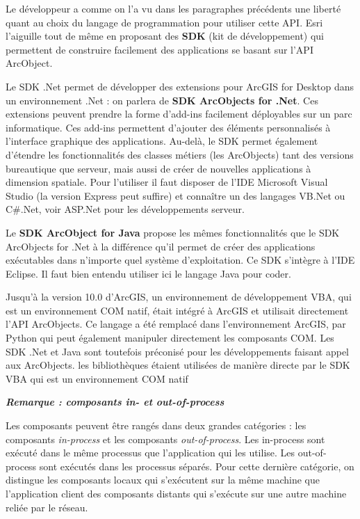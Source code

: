 \documentclass[11pt]{article}
\begin{document}
Le développeur a comme on l'a vu dans les paragraphes précédents une liberté quant au choix du langage de programmation pour utiliser cette API. Esri l'aiguille tout de même en proposant des \textbf{SDK} (kit de développement) qui permettent de construire facilement des applications se basant sur l'API ArcObject.

Le SDK .Net permet de développer des extensions pour ArcGIS for Desktop dans un environnement .Net : on parlera de \textbf{SDK ArcObjects for .Net}. Ces extensions peuvent prendre la forme d'add-ins facilement déployables sur un parc informatique. Ces add-ins permettent d'ajouter des éléments personnalisés à l'interface graphique des applications. Au-delà, le SDK permet également d'étendre les fonctionnalités des classes métiers (les ArcObjects) tant des versions bureautique que serveur, mais aussi de créer de nouvelles applications à dimension spatiale. Pour l'utiliser il faut disposer de l'IDE Microsoft Visual Studio (la version Express peut suffire) et connaître un des langages VB.Net ou C\#.Net, voir ASP.Net pour les développements serveur.

Le \textbf{SDK ArcObject for Java} propose les mêmes fonctionnalités que le SDK ArcObjects for .Net à la différence qu'il permet de créer des applications exécutables dans n'importe quel système d'exploitation. Ce SDK s'intègre à l'IDE Eclipse. Il faut bien entendu utiliser ici le langage Java pour coder.

Jusqu'à la version 10.0 d'ArcGIS, un environnement de développement VBA, qui est un environnement COM natif, était intégré à ArcGIS et utilisait directement l'API ArcObjects. Ce langage a été remplacé dans l'environnement ArcGIS, par Python qui peut également manipuler directement les composants COM. Les SDK .Net et Java sont toutefois préconisé pour les développements faisant appel aux ArcObjects. 
les bibliothèques étaient utilisées de manière directe par le SDK VBA qui est un environnement COM natif

\textbf{\emph{Remarque : composants in- et out-of-process}}

Les composants peuvent être rangés dans deux grandes catégories : les composants \textit{in-process} et les composants \textit{out-of-process}. Les in-process sont exécuté dans le même processus que l'application qui les utilise. Les out-of-process sont exécutés dans les processus séparés. Pour cette dernière catégorie, on distingue les composants locaux qui s'exécutent sur la même machine que l'application client des composants distants qui s'exécute sur une autre machine reliée par le réseau.
\end{document}
